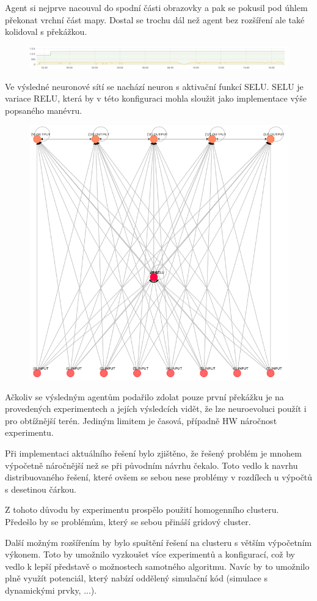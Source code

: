 Agent si nejprve nacouval do spodní části obrazovky a pak se pokusil pod úhlem překonat vrchní část mapy. Dostal se trochu dál než agent bez rozšíření ale také kolidoval s překážkou.
\begin{figure}[H]
	\centering
	\includegraphics[width=0.5\linewidth]{solutions/Iadvanced/advancedGraph}
	\caption{}
	\label{fig:advancedgraph}
\end{figure}
Ve výsledné neuronové sítí se nachází neuron s aktivační funkcí SELU. SELU je variace RELU, která by v této konfiguraci mohla sloužit jako implementace výše popsaného manévru.
\begin{figure}[H]
	\centering
	\includegraphics[width=0.5\linewidth]{solutions/Iadvanced/advanced}
	\caption{}
	\label{fig:advanced}
\end{figure}

Ačkoliv se výsledným agentům podařilo zdolat pouze první překážku je na provedených experimentech a jejích výsledcích vidět, že lze neuroevoluci použít i pro obtížnější terén. Jediným limitem je časová, případně HW náročnost experimentu.

Při implementaci aktuálního řešení bylo zjištěno, že řešený problém je mnohem výpočetně náročnější než se při původním návrhu čekalo. Toto vedlo k navrhu distribuovaného řešení, které ovšem se sebou nese problémy v rozdílech u výpočtů s desetinou čárkou.

Z tohoto důvodu by experimentu prospělo použití homogenního clusteru. Předešlo by se problémům, který se sebou přináší gridový cluster.

Další možným rozšířením by bylo spuštění řešení na clusteru s větším výpočetním výkonem. Toto by umožnilo vyzkoušet více experimentů a konfigurací, což by vedlo k lepší představě o  možnostech samotného algoritmu. Navíc by to umožnilo plně využít potenciál, který nabízí oddělený simulační kód (simulace s dynamickými prvky, ...). 

